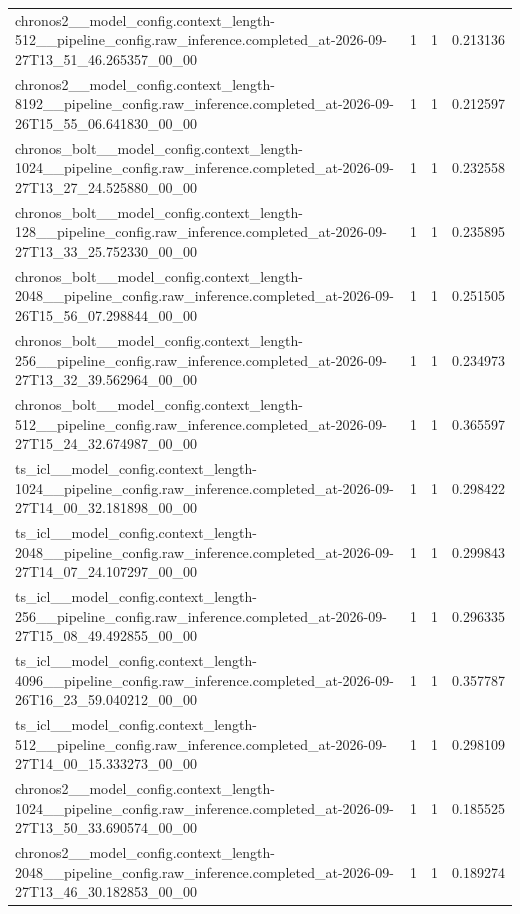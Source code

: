 \begin{tabular}{llll}
chronos2\_\_model\_config.context\_length-512\_\_pipeline\_config.raw\_inference.completed\_at-2026-09-27T13\_51\_46.265357\_00\_00 & 1 & 1 & 0.213136 \\
chronos2\_\_model\_config.context\_length-8192\_\_pipeline\_config.raw\_inference.completed\_at-2026-09-26T15\_55\_06.641830\_00\_00 & 1 & 1 & 0.212597 \\
chronos\_bolt\_\_model\_config.context\_length-1024\_\_pipeline\_config.raw\_inference.completed\_at-2026-09-27T13\_27\_24.525880\_00\_00 & 1 & 1 & 0.232558 \\
chronos\_bolt\_\_model\_config.context\_length-128\_\_pipeline\_config.raw\_inference.completed\_at-2026-09-27T13\_33\_25.752330\_00\_00 & 1 & 1 & 0.235895 \\
chronos\_bolt\_\_model\_config.context\_length-2048\_\_pipeline\_config.raw\_inference.completed\_at-2026-09-26T15\_56\_07.298844\_00\_00 & 1 & 1 & 0.251505 \\
chronos\_bolt\_\_model\_config.context\_length-256\_\_pipeline\_config.raw\_inference.completed\_at-2026-09-27T13\_32\_39.562964\_00\_00 & 1 & 1 & 0.234973 \\
chronos\_bolt\_\_model\_config.context\_length-512\_\_pipeline\_config.raw\_inference.completed\_at-2026-09-27T15\_24\_32.674987\_00\_00 & 1 & 1 & 0.365597 \\
ts\_icl\_\_model\_config.context\_length-1024\_\_pipeline\_config.raw\_inference.completed\_at-2026-09-27T14\_00\_32.181898\_00\_00 & 1 & 1 & 0.298422 \\
ts\_icl\_\_model\_config.context\_length-2048\_\_pipeline\_config.raw\_inference.completed\_at-2026-09-27T14\_07\_24.107297\_00\_00 & 1 & 1 & 0.299843 \\
ts\_icl\_\_model\_config.context\_length-256\_\_pipeline\_config.raw\_inference.completed\_at-2026-09-27T15\_08\_49.492855\_00\_00 & 1 & 1 & 0.296335 \\
ts\_icl\_\_model\_config.context\_length-4096\_\_pipeline\_config.raw\_inference.completed\_at-2026-09-26T16\_23\_59.040212\_00\_00 & 1 & 1 & 0.357787 \\
ts\_icl\_\_model\_config.context\_length-512\_\_pipeline\_config.raw\_inference.completed\_at-2026-09-27T14\_00\_15.333273\_00\_00 & 1 & 1 & 0.298109 \\
chronos2\_\_model\_config.context\_length-1024\_\_pipeline\_config.raw\_inference.completed\_at-2026-09-27T13\_50\_33.690574\_00\_00 & 1 & 1 & 0.185525 \\
chronos2\_\_model\_config.context\_length-2048\_\_pipeline\_config.raw\_inference.completed\_at-2026-09-27T13\_46\_30.182853\_00\_00 & 1 & 1 & 0.189274 \\

\end{tabular}
